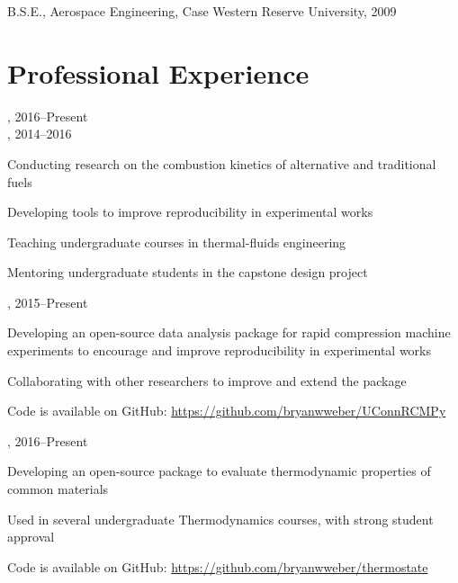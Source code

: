 B.S.E., Aerospace Engineering, Case Western Reserve University, 2009

\section{{\sectionfont Professional Experience}}

,  \hfill 2016--Present\\
,  \hfill 2014--2016

\begin{innerlist}
    \item Conducting research on the combustion kinetics of alternative and traditional fuels
    \item Developing tools to improve reproducibility in experimental works
    \item Teaching undergraduate courses in thermal-fluids engineering
    \item Mentoring undergraduate students in the capstone design project
\end{innerlist}

\vspace{\baselineskip}

,  \hfill 2015--Present

\begin{innerlist}
    \item Developing an open-source data analysis package for rapid compression machine experiments to encourage and improve reproducibility in experimental works
    \item Collaborating with other researchers to improve and extend the package
    \item Code is available on GitHub: \url{https://github.com/bryanwweber/UConnRCMPy}
\end{innerlist}

\vspace{\baselineskip}

,  \hfill 2016--Present

\begin{innerlist}
    \item Developing an open-source package to evaluate thermodynamic properties of common materials
    \item Used in several undergraduate Thermodynamics courses, with strong student approval
    \item Code is available on GitHub: \url{https://github.com/bryanwweber/thermostate}
\end{innerlist}

